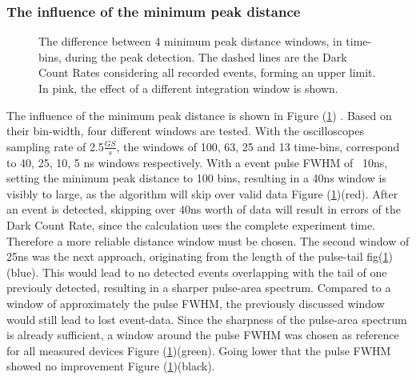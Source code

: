 \documentclass[12pt,article,type=msc,colorback,accentcolor=tud9c]{tudthesis}
\begin{document}
\subsubsection{The influence of the minimum peak distance}
\label{subsec:subsec_mpd}
\begin{figure}[h]
\begin{centering}
\caption{The difference between 4 minimum peak distance windows, in time-bins, during the peak detection. The dashed lines are the Dark Count Rates considering all recorded events, forming an upper limit. In pink, the effect of a different integration window is shown.}
\label{fig:MPD_plot}
\end{centering}
\end{figure}
The influence of the minimum peak distance is shown in Figure (\ref{fig:MPD_plot}) . Based on their bin-width, four different windows are tested. With the oscilloscopes sampling rate of 2.5$\frac{GS}{s}$, the windows of 100, 63, 25 and 13 time-bins, correspond to 40, 25, 10, 5 ns windows respectively. With a event pulse FWHM of ~10ns, setting the minimum peak distance to 100 bins, resulting in a 40ns window is visibly to large, as the algorithm will skip over valid data Figure (\ref{fig:MPD_plot})(red). After an event is detected, skipping over 40ns worth of data will result in errors of the Dark Count Rate, since the calculation uses the complete experiment time. Therefore a more reliable distance window must be chosen. The second window of 25ns was the next approach, originating from the length of the pulse-tail fig(\ref{fig:MPD_plot})(blue). This would lead to no detected events overlapping with the tail of one previouly detected, resulting in a sharper pulse-area spectrum. Compared to a window of approximately the pulse FWHM, the previously discussed window would still lead to lost event-data. Since the sharpness of the pulse-area spectrum is already sufficient, a window around the pulse FWHM was chosen as reference for all measured devices Figure (\ref{fig:MPD_plot})(green). Going lower that the pulse FWHM showed no improvement Figure (\ref{fig:MPD_plot})(black). 
\end{document}
